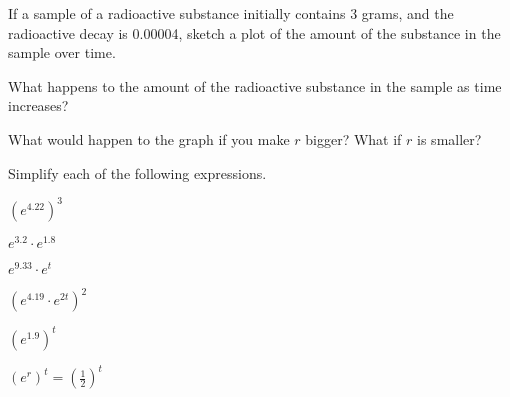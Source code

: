 \begin{problem}
\begin{subproblem}
  \item If a sample of a radioactive substance initially contains 3
    grams, and the radioactive decay is 0.00004, sketch a plot of the
    amount of the substance in the sample over time.

    \vfill

  \item What happens to the amount of the radioactive substance in the
    sample as time increases?
    
    \vspace{3em}

  \item What would happen to the graph if you make $r$ bigger? What if
    $r$ is smaller?

    \vspace{3em}


  \end{subproblem}

\clearpage

\item Simplify each of the following expressions.
  \begin{subproblem}
  \item ${\displaystyle \left(e^{4.22}\right)^3}$
    \vfill
  \item ${\displaystyle e^{3.2}\cdot e^{1.8}}$
    \vfill
  \item ${\displaystyle e^{9.33}\cdot e^{t}}$
    \vfill
  \item ${\displaystyle \left(e^{4.19}\cdot e^{2t}\right)^2}$
    \vfill
  \item ${\displaystyle \left(e^{1.9}\right)^t}$
    \vfill
  \item ${\displaystyle \left(e^r\right)^t = \left( \frac{1}{2} \right)^t}$
    \vfill
  \end{subproblem}

\end{problem}

\postClass

